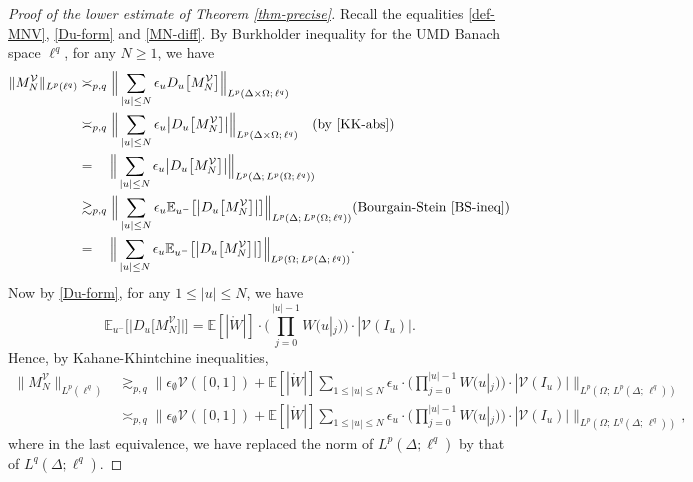 \documentclass[12pt]{amsart}
\theoremstyle{definition}
\theoremstyle{remark}
\newcommand{\E}{\mathbb{E}}
\numberwithin{equation}{section}
\begin{document}
\begin{proof}[Proof of the lower estimate of Theorem \ref{thm-precise}]
Recall the equalities \eqref{def-MNV}, \eqref{Du-form} and \eqref{MN-diff}.  By Burkholder inequality for the UMD Banach space $\ell^q$, for any $N\ge 1$, we have 
\begin{align*}
\|M_N^\mathcal{V}\|_{L^p(\ell^q)}   & \asymp_{p,q}   \Big \| \sum_{|u|\le N} \epsilon_u  D_u\big[M_N^\mathcal{V}\big] \Big\|_{L^p(\Delta\times \Omega; \, \ell^q)}
\\
&  \asymp_{p,q}  \Big \| \sum_{|u|\le N} \epsilon_u  \big| D_u\big[M_N^\mathcal{V}\big]\big| \Big\|_{L^p(\Delta \times \Omega; \, \ell^q)}  \quad \text{(by \eqref{KK-abs})}
\\
  & =  \quad \Big \| \sum_{|u|\le N} \epsilon_u  \big| D_u\big[M_N^\mathcal{V}\big]\big| \Big\|_{L^p(\Delta; \, L^p( \Omega; \, \ell^q))}
\\
&   \gtrsim_{p,q}   \Big \| \sum_{|u|\le N} \epsilon_u   \E_{u^{-}} \big[ \big| D_u\big[M_N^\mathcal{V}\big]\big|\big] \Big\|_{L^p(\Delta; \, L^p( \Omega; \, \ell^q))}  ( \text{Bourgain-Stein \eqref{BS-ineq}})
\\
& = \quad  \Big \| \sum_{|u|\le N} \epsilon_u   \E_{u^{-}} \big[ \big| D_u\big[M_N^\mathcal{V}\big]\big|\big] \Big\|_{L^p(\Omega; \, L^p( \Delta; \, \ell^q))}. 
\end{align*}
Now by \eqref{Du-form}, for any $1\le |u|\le N$,  we have
\[
\E_{u^{-}} \big[ \big| D_u\big[M_N^\mathcal{V}\big]\big|\big] =  \E[|\mathring{W}|] \cdot \Big(  \prod_{j=0}^{|u|-1} W(u|_j) \Big)  \cdot |\mathcal{V}(I_u) |. 
\]
Hence, by Kahane-Khintchine inequalities, 
\begin{align*}
\|M_N^\mathcal{V}\|_{L^p(\ell^q)}  &  \gtrsim_{p,q}  \Big\| \epsilon_\emptyset \mathcal{V}([0,1]) +  \E[|\mathring{W}|] \sum_{1\le |u|\le N}  \epsilon_u   \cdot \Big(  \prod_{j=0}^{|u|-1} W(u|_j) \Big)  \cdot |\mathcal{V}(I_u) |  \Big\|_{L^p(\Omega; \, L^p( \Delta; \, \ell^q))} 
\\
& \asymp_{p,q}   \Big\| \epsilon_\emptyset \mathcal{V}([0,1]) +  \E[|\mathring{W}|] \sum_{1\le |u|\le N}  \epsilon_u   \cdot \Big(  \prod_{j=0}^{|u|-1} W(u|_j) \Big)  \cdot |\mathcal{V}(I_u) |  \Big\|_{L^p(\Omega; \, L^q( \Delta; \, \ell^q))},
\end{align*}
where in the last equivalence, we have replaced the norm of $L^p(\Delta; \ell^q)$ by that of  $L^q(\Delta; \ell^q)$. 




\end{proof}
\end{document}
